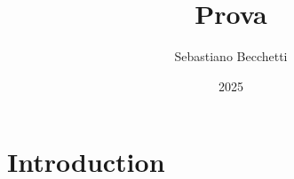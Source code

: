\documentclass{article}
\title{Prova}
\author{Sebastiano Becchetti}
\date{2025}
\begin{document}
\maketitle

\section{Introduction}
\end{document}
